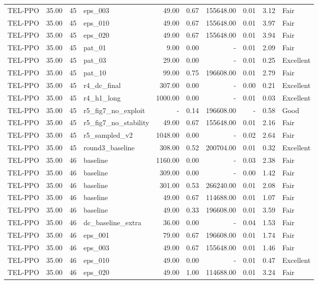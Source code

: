 \begin{table}[htbp]
\begin{tabular}{lrrlrrrrrl}
TEL-PPO & 35.00 & 45 & eps_003 & 49.00 & 0.67 & 155648.00 & 0.01 & 3.12 & Fair \\
TEL-PPO & 35.00 & 45 & eps_010 & 49.00 & 0.67 & 155648.00 & 0.01 & 3.97 & Fair \\
TEL-PPO & 35.00 & 45 & eps_020 & 49.00 & 0.67 & 155648.00 & 0.01 & 3.94 & Fair \\
TEL-PPO & 35.00 & 45 & pat_01 & 9.00 & 0.00 & - & 0.01 & 2.09 & Fair \\
TEL-PPO & 35.00 & 45 & pat_03 & 29.00 & 0.00 & - & 0.01 & 0.25 & Excellent \\
TEL-PPO & 35.00 & 45 & pat_10 & 99.00 & 0.75 & 196608.00 & 0.01 & 2.79 & Fair \\
TEL-PPO & 35.00 & 45 & r4_dc_final & 307.00 & 0.00 & - & 0.00 & 0.21 & Excellent \\
TEL-PPO & 35.00 & 45 & r4_h1_long & 1000.00 & 0.00 & - & 0.01 & 0.03 & Excellent \\
TEL-PPO & 35.00 & 45 & r5_fig7_no_exploit & - & 0.14 & 196608.00 & - & 0.58 & Good \\
TEL-PPO & 35.00 & 45 & r5_fig7_no_stability & 49.00 & 0.67 & 155648.00 & 0.01 & 2.16 & Fair \\
TEL-PPO & 35.00 & 45 & r5_sampled_v2 & 1048.00 & 0.00 & - & 0.02 & 2.64 & Fair \\
TEL-PPO & 35.00 & 45 & round3_baseline & 308.00 & 0.52 & 200704.00 & 0.01 & 0.32 & Excellent \\
TEL-PPO & 35.00 & 46 & baseline & 1160.00 & 0.00 & - & 0.03 & 2.38 & Fair \\
TEL-PPO & 35.00 & 46 & baseline & 309.00 & 0.00 & - & 0.00 & 1.42 & Fair \\
TEL-PPO & 35.00 & 46 & baseline & 301.00 & 0.53 & 266240.00 & 0.01 & 2.08 & Fair \\
TEL-PPO & 35.00 & 46 & baseline & 49.00 & 0.67 & 114688.00 & 0.01 & 1.07 & Fair \\
TEL-PPO & 35.00 & 46 & baseline & 49.00 & 0.33 & 196608.00 & 0.01 & 3.59 & Fair \\
TEL-PPO & 35.00 & 46 & dc_baseline_extra & 36.00 & 0.00 & - & 0.04 & 1.53 & Fair \\
TEL-PPO & 35.00 & 46 & eps_001 & 79.00 & 0.67 & 196608.00 & 0.01 & 1.74 & Fair \\
TEL-PPO & 35.00 & 46 & eps_003 & 49.00 & 0.67 & 155648.00 & 0.01 & 1.46 & Fair \\
TEL-PPO & 35.00 & 46 & eps_010 & 49.00 & 0.00 & - & 0.01 & 0.47 & Excellent \\
TEL-PPO & 35.00 & 46 & eps_020 & 49.00 & 1.00 & 114688.00 & 0.01 & 3.24 & Fair \\

\end{tabular}
\end{table}
